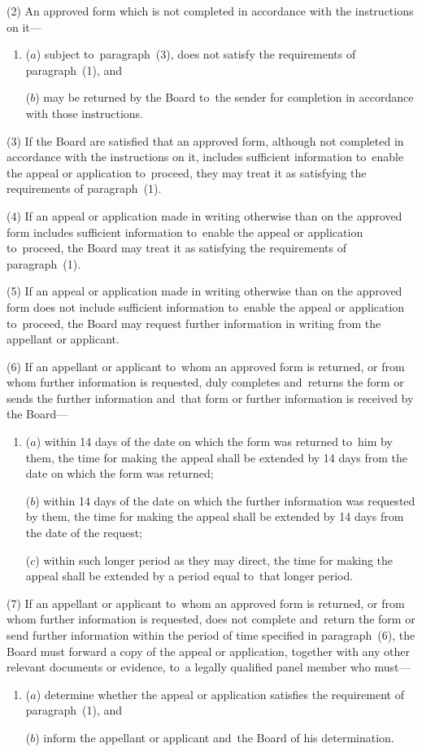 \documentclass[12pt,a4paper]{article}
\begin{document}
(2) An approved form which is not completed in accordance with the instructions on it—
\begin{enumerate}\item[]
($a$) subject to~paragraph~(3), does not satisfy the requirements of paragraph~(1), and

($b$) may be returned by the Board to~the sender for completion in accordance with those instructions.
\end{enumerate}

(3) If the Board are satisfied that an approved form, although not completed in accordance with the instructions on it, includes sufficient information to~enable the appeal or application to~proceed, they may treat it as satisfying the requirements of paragraph~(1).

(4) If an appeal or application made in writing otherwise than on the approved form includes sufficient information to~enable the appeal or application to~proceed, the Board may treat it as satisfying the requirements of paragraph~(1).

(5) If an appeal or application made in writing otherwise than on the approved form does not include sufficient information to~enable the appeal or application to~proceed, the Board may request further information in writing from the appellant or applicant.

(6) If an appellant or applicant to~whom an approved form is returned, or from whom further information is requested, duly completes and~returns the form or sends the further information and~that form or further information is received by the Board—
\begin{enumerate}\item[]
($a$) within 14 days of the date on which the form was returned to~him by them, the time for making the appeal shall be extended by 14 days from the date on which the form was returned;

($b$) within 14 days of the date on which the further information was requested by them, the time for making the appeal shall be extended by 14 days from the date of the request;

($c$) within such longer period as they may direct, the time for making the appeal shall be extended by a period equal to~that longer period.
\end{enumerate}

(7) If an appellant or applicant to~whom an approved form is returned, or from whom further information is requested, does not complete and~return the form or send further information within the period of time specified in paragraph~(6), the Board must forward a copy of the appeal or application, together with any other relevant documents or evidence, to~a legally qualified panel member who must—
\begin{enumerate}\item[]
($a$) determine whether the appeal or application satisfies the requirement of paragraph~(1), and

($b$) inform the appellant or applicant and~the Board of his determination.
\end{enumerate}
\end{document}
